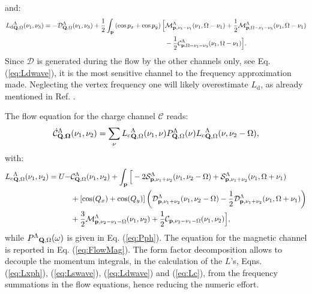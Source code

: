 and: 
\begin{align} 
\label{eq:Ldwave}
{L_\mathrm{d}}^{\Lambda}_{\mathbf{Q},\Omega}(\nu_1,\nu_3) = -\mathcal{D}^{\Lambda}_{\mathbf{Q},\Omega}(\nu_1,\nu_3) 
+ \frac{1}{2}\int_{\mathbf{p}} \left(\cos{p_x}+\cos{p_y}\right) \Big[ 
& \mathcal{M}^{\Lambda}_{\mathbf{p},\nu_3-\nu_1}(\nu_1,\Omega-\nu_1) 
+ \frac{1}{2} \mathcal{M}^{\Lambda}_{\mathbf{p},\Omega-\nu_1-\nu_3}(\nu_1,\Omega-\nu_1) \\
&- \frac{1}{2} \mathcal{C}^{\Lambda}_{\mathbf{p},\Omega-\nu_1-\nu_3}(\nu_1,\Omega-\nu_1) \Big].
\end{align}	 
Since $\mathcal{D}$ is generated during the flow by the other channels only, see Eq. (\ref{eq:Ldwave}), it is the most sensitive channel to the frequency approximation made.  
Neglecting the vertex frequency one will likely overestimate $L_{\mathrm{d}}$, as already mentioned in Ref. .

The flow equation for the charge channel $\mathcal{C}$ reads:
\begin{equation}
\dot{\mathcal{C}}^{\Lambda}_{\mathbf{Q,\Omega}}(\nu_1,\nu_2) = \sum_{\nu}{L_\mathrm{c}}^{\Lambda}_{\mathbf{Q},\Omega} (\nu_1,\nu) P^{\Lambda}_{\mathbf{Q},\Omega}(\nu) 
{L_\mathrm{c}}^{\Lambda}_{\mathbf{Q},\Omega} (\nu,\nu_2-\Omega), 
\end{equation} 	   
with: 
 \begin{align} 
 \label{eq:Lc}
{L_\mathrm{c}}^{\Lambda}_{\mathbf{Q},\Omega}(\nu_1,\nu_2)=U-&\mathcal{C}^{\Lambda}_{\mathbf{Q},\Omega}(\nu_1,\nu_2)
+ \int_{\mathbf{p}} \Big [
- 2 \mathcal{S}^{\Lambda}_{\mathbf{p},\nu_1+\nu_2}(\nu_1,\nu_2-\Omega) + \mathcal{S}^{\Lambda}_{\mathbf{p},\nu_1+\nu_2}(\nu_1,\Omega+\nu_1)
\\ &+  [\cos(Q_x)+\cos(Q_y)]\left( \mathcal{D}^{\Lambda}_{\mathbf{p},\nu_1+\nu_2}(\nu_1,\nu_2-\Omega) -\frac{1}{2} \mathcal{D}^{\Lambda}_{\mathbf{p},\nu_1+\nu_2}(\nu_1,\Omega+\nu_1) \right)
\\ &+ \frac{3}{2} \mathcal{M}^{\Lambda}_{\mathbf{p},\nu_2-\nu_1-\Omega}(\nu_1,\nu_2)
+ \frac{1}{2} \mathcal{C}_{\mathbf{p},\nu_2-\nu_1-\Omega}(\nu_1,\nu_2) \Big],
\end{align}
while ${P^{\Lambda}}_{\mathbf{Q},\Omega}(\omega)$ is given in Eq. (\ref{eq:Pph}).
The equation for the magnetic channel is reported in Eq. (\ref{eq:FlowMag}).
The form factor decomposition allows to decouple the momentum integrals, in the calculation of the $L$'s, Eqns. (\ref{eq:Lxph}), (\ref{eq:Lswave}), (\ref{eq:Ldwave}) and (\ref{eq:Lc}), from the frequency summations in the flow equations, hence reducing the numeric effort.   	 


